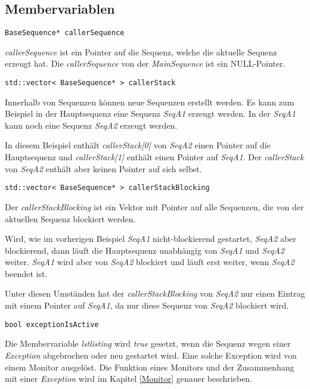 \subsection{Membervariablen}
\begin{lstlisting}
BaseSequence* callerSequence
\end{lstlisting}
\textit{callerSequence} ist ein Pointer auf die Sequenz, welche die aktuelle Sequenz erzeugt hat.
Die \textit{callerSequence} von der \textit{MainSequence} ist ein NULL-Pointer.


\begin{lstlisting}
std::vector< BaseSequence* > callerStack
\end{lstlisting}
Innerhalb von Sequenzen können neue Sequenzen erstellt werden.
Es kann zum Beispiel in der Hauptsequenz eine Sequenz \textit{SeqA1} erzeugt werden.
In der \textit{SeqA1} kann noch eine Sequenz \textit{SeqA2} erzeugt werden.

In diesem Beispiel enthält \textit{callerStack[0]} von \textit{SeqA2} einen Pointer auf die Hauptsequenz und \textit{callerStack[1]} enthält einen Pointer auf \textit{SeqA1}.
Der \textit{callerStack} von \textit{SeqA2} enthält aber keinen Pointer auf sich selbst.


\begin{lstlisting}
std::vector< BaseSequence* > callerStackBlocking
\end{lstlisting}
Der \textit{callerStackBlocking} ist ein Vektor mit Pointer auf alle Sequenzen, die von der aktuellen Sequenz blockiert werden.

Wird, wie im vorherigen Beispiel \textit{SeqA1} nicht-blockierend gestartet, \textit{SeqA2} aber blockierend, dann läuft die Hauptsequenz unabhängig von \textit{SeqA1} und \textit{SeqA2} weiter.
\textit{SeqA1} wird aber von \textit{SeqA2} blockiert und läuft erst weiter, wenn \textit{SeqA2} beendet ist.

Unter diesen Umständen hat der \textit{callerStackBlocking} von \textit{SeqA2} nur einen Eintrag mit einem Pointer auf \textit{SeqA1}, da nur diese Sequenz von \textit{SeqA2} blockiert wird.


\begin{lstlisting}
bool exceptionIsActive 
\end{lstlisting}
Die Membervariable \textit{lstlisting} wird \textit{true} gesetzt, wenn die Sequenz wegen einer \textit{Exception} abgebrochen oder neu gestartet wird.
Eine solche Exception wird von einem Monitor ausgelöst.
Die Funktion eines Monitors und der Zusammenhang mit einer \textit{Exception} wird im Kapitel \ref{Monitor} genauer beschrieben.


